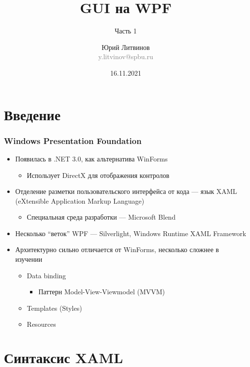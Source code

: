 \documentclass[xetex,mathserif,serif]{beamer}
\title{GUI на WPF}
\subtitle{Часть 1}
\author[Юрий Литвинов]{Юрий Литвинов\\\small{\textcolor{gray}{y.litvinov@spbu.ru}}}
\date{16.11.2021}
\begin{document}
    \frame{\titlepage}

    \section{Введение}

    \begin{frame}
        \frametitle{Windows Presentation Foundation}
        \begin{itemize}
            \item Появилась в .NET 3.0, как альтернатива WinForms
            \begin{itemize}
                \item Использует DirectX для отображения контролов
            \end{itemize}
            \item Отделение разметки пользовательского интерфейса от кода --- язык XAML (eXtensible Application Markup Language)
            \begin{itemize}
                \item Специальная среда разработки --- Microsoft Blend
            \end{itemize}
            \item Несколько ``веток'' WPF --- Silverlight, Windows Runtime XAML Framework
            \item Архитектурно сильно отличается от WinForms, несколько сложнее в изучении
            \begin{itemize}
                \item Data binding
                \begin{itemize}
                    \item Паттерн Model-View-Viewmodel (MVVM)
                \end{itemize}
                \item Templates (Styles)
                \item Resources
            \end{itemize}
        \end{itemize}
    \end{frame}

    \section{Синтаксис XAML}
\end{document}
